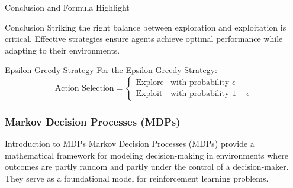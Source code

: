 \documentclass[aspectratio=169]{beamer}
\begin{document}
\begin{frame}[fragile]{Conclusion and Formula Highlight}
    \begin{block}{Conclusion}
        Striking the right balance between exploration and exploitation is critical. Effective strategies ensure agents achieve optimal performance while adapting to their environments.
    \end{block}

    \begin{block}{Epsilon-Greedy Strategy}
        For the Epsilon-Greedy Strategy:
        \begin{equation}
        \text{Action Selection} = 
        \begin{cases} 
        \text{Explore} & \text{with probability } \epsilon \\ 
        \text{Exploit} & \text{with probability } 1 - \epsilon 
        \end{cases}
        \end{equation}
    \end{block}
\end{frame}

\begin{frame}[fragile]
    \frametitle{Markov Decision Processes (MDPs)}
    \begin{block}{Introduction to MDPs}
        Markov Decision Processes (MDPs) provide a mathematical framework for modeling decision-making in environments where outcomes are partly random and partly under the control of a decision-maker. They serve as a foundational model for reinforcement learning problems.
    \end{block}
\end{frame}
\end{document}
